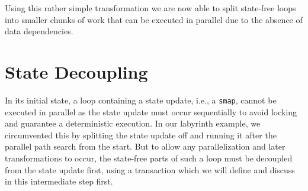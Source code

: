 Using this rather simple transformation we are now able to split state-free loops into smaller chunks of work that can be executed in parallel due to the absence of data dependencies.

\section{State Decoupling}%
\label{sec:transformations:tf15}

In its initial state, a loop containing a state update, i.e., a \texttt{smap}, cannot be executed in parallel as the state update must occur sequentially to avoid locking and guarantee a deterministic execution.
In our labyrinth example, we circumvented this by splitting the state update off and running it after the parallel path search from the start.
But to allow any parallelization and later transformations to occur, the state-free parts of such a loop must be decoupled from the state update first, using a transaction which we will define and discuss in this intermediate step first.

